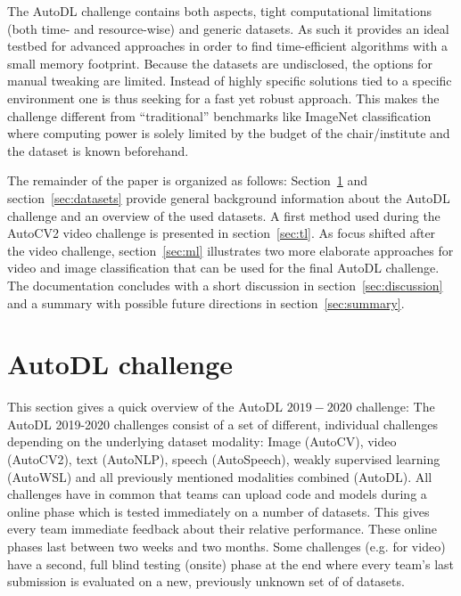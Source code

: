 \documentclass{article}
\begin{document}
The AutoDL challenge contains both aspects, tight computational limitations (both time- and resource-wise) and generic datasets. As such it provides an ideal testbed for advanced approaches in order to find time-efficient algorithms with a small memory footprint. Because the datasets are undisclosed, the options for manual tweaking are limited. Instead of highly specific solutions tied to a specific environment one is thus seeking for a fast yet robust approach. This makes the challenge different from ``traditional'' benchmarks like ImageNet classification where computing power is solely limited by the budget of the chair/institute and the dataset is known beforehand.

The remainder of the paper is organized as follows: Section~\ref{sec:autodl} and section~\ref{sec:datasets} provide general background information about the AutoDL challenge and an overview of the used datasets. A first method used during the AutoCV2 video challenge is presented in section~\ref{sec:tl}. As focus shifted after the video challenge, section~\ref{sec:ml} illustrates two more elaborate approaches for video and image classification that can be used for the final AutoDL challenge. The documentation concludes with a short discussion in section~\ref{sec:discussion} and a summary with possible future directions in section~\ref{sec:summary}.


\section{AutoDL challenge}
\label{sec:autodl}
This section gives a quick overview of the AutoDL $2019-2020$ challenge: The AutoDL 2019-2020 challenges consist of a set of different, individual challenges depending on the underlying dataset modality: Image (AutoCV), video (AutoCV2), text (AutoNLP), speech (AutoSpeech), weakly supervised learning (AutoWSL) and all previously mentioned modalities combined (AutoDL). 
All challenges have in common that teams can upload code and models during a online phase which is tested immediately on a number of datasets. This gives every team immediate feedback about their relative performance. These online phases last between two weeks and two months. Some challenges (e.g. for video) have a second, full blind testing (onsite) phase at the end where every team's last submission is evaluated on a new, previously unknown set of of datasets. 
\end{document}
